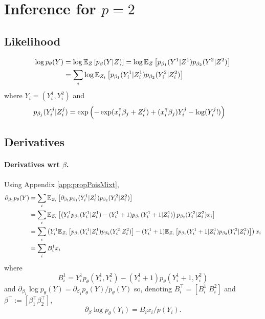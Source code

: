 \section{Inference for $p = 2$} \label{sec:inferenceP2}

\subsection{Likelihood}

\begin{align*}
 \log p_\theta(Y) 
 & = \log\mathbb E_Z \left[ p_\beta(Y|Z) \right]
 = \log \mathbb E_Z \left[ p_{\beta_1}(Y^1|Z^1) p_{\beta_2}(Y^2|Z^2) \right] \\
 & = \sum_i \log \mathbb E_{Z_i} \left[ p_{\beta_1}(Y_i^1|Z_i^1) p_{\beta_2}(Y_i^2|Z_i^2) \right]
\end{align*}
where $Y_i = (Y_i^1, Y_i^2)$ and
\begin{align*}
 p_{\beta_j}(Y_i^j|Z_i^j) 
 & = \exp\left(-\exp(x_i^\intercal \beta_j + Z_i^j) + (x_i^\intercal \beta_j) Y_i^j - \log(Y_i^j !)
 \right) 
\end{align*}

\subsection{Derivatives}

\paragraph{Derivatives wrt $\beta$.}
Using Appendix \ref{app:propPoisMixt},
\begin{align*}
  \partial_{\beta_1} p_\theta(Y) 
  & = \sum_i \mathbb E_{Z_i} \left[ \partial_{\beta_1} p_{\beta_1}(Y_i^1|Z_i^1) p_{\beta_2}(Y_i^2|Z_i^2) \right] \\
  & = \sum_i \mathbb E_{Z_i} \left[ \left( Y_i^1 p_{\beta_1}(Y_i^1|Z_i^1) - (Y_i^1 +1)p_{\beta_1}(Y_i^1+1|Z_i^1) \right)  p_{\beta_2}(Y_i^2|Z_i^2) x_i \right] \\
  & = \sum_i \left( Y_i^1 \mathbb E_{Z_i} \left[ p_{\beta_1}(Y_i^1|Z_i^1) p_{\beta_2}(Y_i^2|Z_i^2) \right] 
  -(Y_i^1 +1) \mathbb E_{Z_i} \left[ p_{\beta_1}(Y_i^1+1|Z_i^1) p_{\beta_2}(Y_i^2|Z_i^2) \right] \right) x_i \\
  & = \sum_i B_i^1 x_i
\end{align*}
where
$$
B_i^1 = Y_i^1 p_\theta(Y_i^1, Y_i^2) -(Y_i^1 +1)p_\theta(Y_i^1+1, Y_i^2)
$$
and $\partial_{\beta_1} \log p_\theta(Y) = \partial_{\beta_1} p_\theta(Y) / p_\theta(Y)$ so, denoting $B_i^\intercal = [B_i^1 \; B_i^2]$ and $\beta^\intercal := [\beta_1^\intercal \beta_2^\intercal]$,
$$
\partial_\beta \log p_\theta(Y_i) = B_i x_i / p(Y_i).
$$

